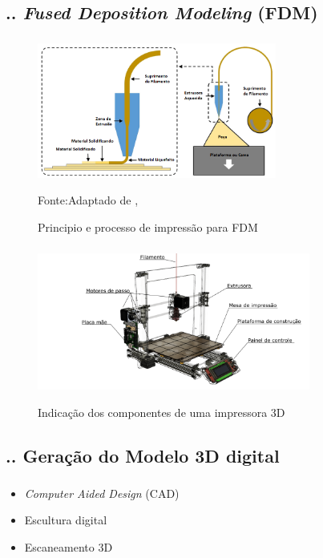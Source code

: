 \documentclass[aspectratio=169]{beamer}
\begin{document}
\subsection{\insertsectionnumber .\insertsubsectionnumber . \textit{Fused Deposition Modeling} (FDM)}
\begin{frame}
  \frametitle{\insertsubsection}
  \begin{figure}[H]
    \begin{center}
    \caption{Principio e processo de impressão para FDM}
    \includegraphics[width=0.7\textwidth]{bikas2015FDM}

    {\footnotesize Fonte:Adaptado de \citeauthor{bikas16}, \citeyear{bikas16}}
    \label{fig:fdm_ex}
    \end{center}
\end{figure}
\end{frame}

\begin{frame}
  \frametitle{\insertsubsection}
  \begin{figure}[H]
    \centering
    \caption{Indicação dos componentes de uma impressora 3D}
    \includegraphics[width=0.8\textwidth]{printer_components}
    \label{fig:impressora3d_comp}
  \end{figure}
\end{frame}

\subsection{\insertsectionnumber .\insertsubsectionnumber . Geração do Modelo 3D digital}
\begin{frame}
  \frametitle{\insertsubsection}
  \begin{itemize}
    \item \textit{Computer Aided Design} (CAD)
    \item Escultura digital
    \item Escaneamento 3D
  \end{itemize}
\end{frame}
\end{document}
